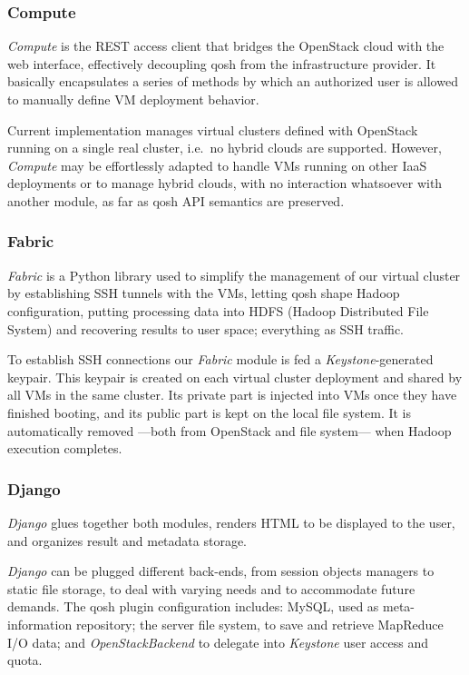\documentclass[conference]{IEEEtran}
\begin{document}
\subsubsection{Compute}
\noindent \emph{Compute} is the REST access client that bridges the OpenStack cloud with the web interface, effectively decoupling qosh from the infrastructure provider. It basically encapsulates a series of methods by which an authorized user is allowed to manually define VM deployment behavior.

Current implementation manages virtual clusters defined with OpenStack running on a single real cluster, i.e.\ no hybrid clouds are supported. However, \emph{Compute} may be effortlessly adapted to handle VMs running on other IaaS deployments or to manage hybrid clouds, with no interaction whatsoever with another module, as far as qosh API semantics are preserved.


\subsubsection{Fabric}
\noindent \emph{Fabric} is a Python library used to simplify the management of our virtual cluster by establishing SSH tunnels with the VMs, letting qosh shape Hadoop configuration, putting processing data into HDFS (Hadoop Distributed File System) and recovering results to user space; everything as SSH traffic.

To establish SSH connections our \emph{Fabric} module is fed a \emph{Keystone}-generated keypair. This keypair is created on each virtual cluster deployment and shared by all VMs in the same cluster. Its private part is injected into VMs once they have finished booting, and its public part is kept on the local file system. It is automatically removed ---both from OpenStack and file system--- when Hadoop execution completes.


\subsubsection{Django}
\noindent \emph{Django} glues together both modules, renders HTML to be displayed to the user, and organizes result and metadata storage.

\emph{Django} can be plugged different back-ends, from session objects managers to static file storage, to deal with varying needs and to accommodate future demands. The qosh plugin configuration includes: MySQL, used as meta-information repository; the server file system, to save and retrieve MapReduce I/O data; and \emph{OpenStackBackend} to delegate into \emph{Keystone} user access and quota.
\end{document}
